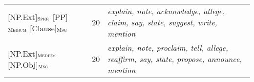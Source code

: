 \documentclass[output=paper,colorlinks,citecolor=brown]{langscibook}
\begin{document}
\begin{table}[t]
\begin{tabularx}{\textwidth}{ lrQ }
{[NP.Ext]}$_{\text{\textsc{Spkr}}}$ {[PP]}$_{\text{\textsc{Medium}}}$ {[Clause]}$_{\text{\textsc{Msg}}}$  & 20 & \textit{explain, note, acknowledge, allege, claim, say, state, suggest, write, mention}\\
{[NP.Ext]}$_{\text{\textsc{Medium}}}$ {[NP.Obj]}$_{\text{\textsc{Msg}}}$  & 20 & \textit{explain, note, proclaim, tell, allege, reaffirm, say, state, propose, announce, mention}\\

\end{tabularx}
\end{table}
\end{document}
